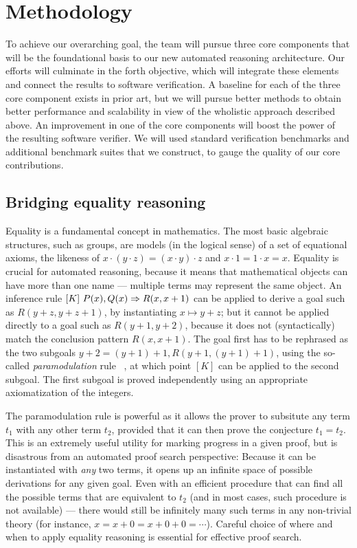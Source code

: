\section{Methodology}
\label{b2:methodology}

To achieve our overarching goal, the team will pursue three core components that will be the foundational basis to our new automated reasoning architecture.
Our efforts will culminate in the forth objective, which will integrate these elements and connect the results to software verification.
A baseline for each of the three core component exists in prior art, but we will pursue better methods to obtain better performance and scalability in view of the wholistic approach described above.
An improvement in one of the core components will boost the power of the resulting software verifier.
We will used standard verification benchmarks and additional benchmark suites that we construct, to gauge the quality of our core contributions.


\subsection{Bridging equality reasoning}

Equality is a fundamental concept in mathematics.
The most basic algebraic structures, such as groups,
are models (in the logical sense) of a set of equational
axioms, the likeness of $x\cdot(y\cdot z) = (x\cdot y)\cdot z$ and $x\cdot 1 = 1\cdot x = x$.
Equality is crucial for automated reasoning, because it means that mathematical objects can have more than one name --- multiple terms may represent the same object.
An inference rule $[K]~{P(x),Q(x)} \Rightarrow {R(x, x+1)}$
can be applied to derive a goal such as $R(y+z, y+z+1)$,
by instantiating $x\mapsto y+z$;
but it cannot be applied directly to a goal such as
$R(y+1, y+2)$, because it does not (syntactically) match the conclusion pattern $R(x,x+1)$.
The goal first has to be rephrased as the two subgoals
$y + 2 = (y + 1) + 1, R(y+1, (y+1)+1)$, using the so-called \emph{paramodulation} rule%
~\cite{Book2001:Nieuwenhuis},
at which point $[K]$ can be applied to the second subgoal.
The first subgoal is proved independently using an appropriate axiomatization of the integers.

The paramodulation rule is powerful as it allows the prover to subsitute any term $t_1$ with any other term $t_2$, provided that it can then prove the conjecture $t_1 = t_2$.
This is an extremely useful utility for marking progress in a given proof, but is disastrous from an automated proof search perspective:
Because it can be instantiated with \emph{any} two terms, it opens up an infinite space of possible derivations for any given goal.
Even with an efficient procedure that can find all the possible terms that are equivalent to $t_2$ (and in most cases, such procedure is not available) ---
there would still be infinitely many such terms in any non-trivial theory (for instance, $x = x + 0 = x + 0 + 0 = \cdots$).
Careful choice of where and when to apply equality reasoning is essential for effective proof search.

